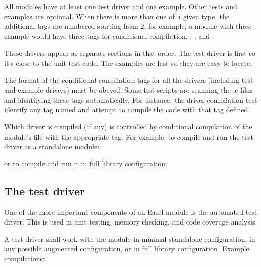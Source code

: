 All modules have at least one test driver and one example. Other tests
and examples are optional. When there is more than one 
of a given type, the additional tags are numbered starting from 2: for
example, a module with three example  would have three
tags for conditional compilation, ,
, and .

These drivers appear as separate sections in that order. The test
driver is first so it's close to the unit test code. The examples are
last so they are easy to locate.

The format of the conditional compilation tags for all the drivers
(including test and example drivers) must be obeyed. Some test scripts
are scanning the .c files and identifying these tags
automatically. For instance, the driver compilation test identify any
tag named
and attempt to compile the code with that tag defined.

Which driver is compiled (if any) is controlled by conditional
compilation of the module's  file with the appropriate
tag. For example, to compile and run the  test driver as
a standalone module:

\begin{cchunk}
\end{cchunk}

or to compile and run it in full library configuration:

\begin{cchunk}
\end{cchunk}

\subsection{The test driver}

One of the more important components of an Easel module is the
automated test driver. This  is used in unit testing,
memory checking, and code coverage analysis.

A test driver shall work with the module in minimal standalone configuration, in any
possible augmented configuration, or in full library
configuration. Example compilations:
\begin{cchunk}
\end{cchunk}

